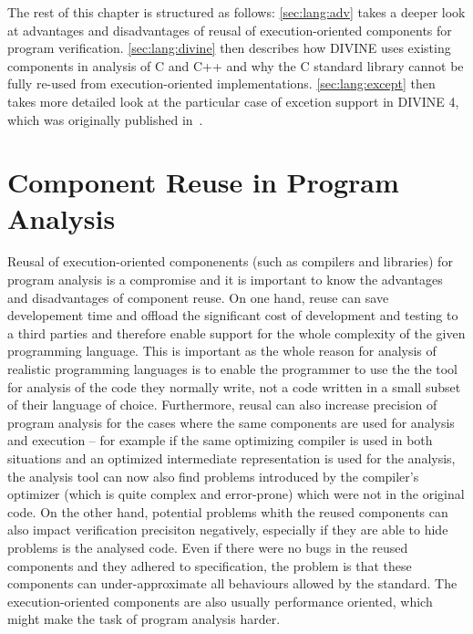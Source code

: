 The rest of this chapter is structured as follows: \autoref{sec:lang:adv} takes a deeper look at advantages and disadvantages of reusal of execution-oriented components for program verification.
\autoref{sec:lang:divine} then describes how DIVINE uses existing components in analysis of C and C++ and why the C standard library cannot be fully re-used from execution-oriented implementations.
\autoref{sec:lang:except} then takes more detailed look at the particular case of excetion support in DIVINE 4, which was originally published in~.


\section{Component Reuse in Program Analysis}\label{sec:lang:adv}

Reusal of execution-oriented componenents (such as compilers and libraries) for
program analysis is a compromise and it is important to know the advantages and
disadvantages of component reuse.
On one hand, reuse can save developement time and offload the significant cost
of development and testing to a third parties and therefore enable support for the whole complexity of the given programming language.
This is important as the whole reason for analysis of realistic programming languages is to enable the programmer to use the the tool for analysis of the code they normally write, not a code written in a small subset of their language of choice.
Furthermore, reusal can also increase precision of program analysis for the cases where the same components are used for analysis and execution -- for example if the same optimizing compiler is used in both situations and an optimized intermediate representation is used for the analysis, the analysis tool can now also find problems introduced by the compiler's optimizer (which is quite complex and error-prone) which were not in the original code.
On the other hand, potential problems whith the reused components can also
impact verification precisiton negatively, especially if they are able to hide
problems is the analysed code.
Even if there were no bugs in the reused components and they adhered to specification, the problem is that these components can under-approximate all behaviours allowed by the standard.
The execution-oriented components are also usually performance oriented, which might make the task of program analysis harder.

